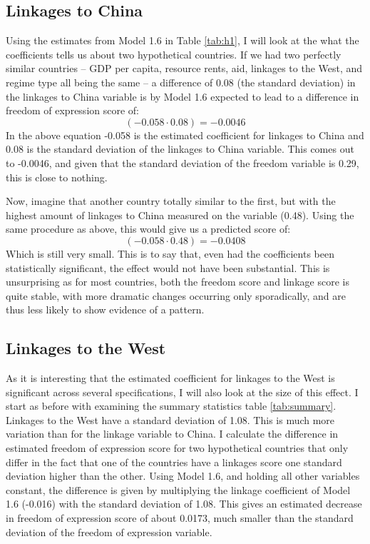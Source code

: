 \subsection{Linkages to China}
Using the estimates from Model 1.6 in Table \ref{tab:h1}, I will look at the what the coefficients tells us about two hypothetical countries. If we had two perfectly similar countries -- GDP per capita, resource rents, aid, linkages to the West, and regime type all being the same -- a difference of 0.08 (the standard deviation) in the linkages to China variable is by Model 1.6 expected to lead to a difference in freedom of expression score of:
\begin{equation*}
    (-0.058 \cdot 0.08) = -0.0046
\end{equation*}
In the above equation -0.058 is the estimated coefficient for linkages to China and 0.08 is the standard deviation of the linkages to China variable. This comes out to -0.0046, and given that the standard deviation of the freedom variable is 0.29, this is close to nothing.

Now, imagine that another country totally similar to the first, but with the highest amount of linkages to China measured on the variable (0.48). Using the same procedure as above, this would give us a predicted score of:
\begin{equation*}
    (-0.058 \cdot 0.48) = -0.0408
\end{equation*}
Which is still very small. This is to say that, even had the coefficients been statistically significant, the effect would not have been substantial. This is unsurprising as for most countries, both the freedom score and linkage score is quite stable, with more dramatic changes occurring only sporadically, and are thus less likely to show evidence of a pattern.

\subsection{Linkages to the West} \label{sec:west_coefficients}
As it is interesting that the estimated coefficient for linkages to the West is significant across several specifications, I will also look at the size of this effect. I start as before with examining the summary statistics table \ref{tab:summary}. Linkages to the West have a standard deviation of 1.08. This is much more variation than for the linkage variable to China. I calculate the difference in estimated freedom of expression score for two hypothetical countries that only differ in the fact that one of the countries have a linkages score one standard deviation higher than the other. Using Model 1.6, and holding all other variables constant, the difference is given by multiplying the linkage coefficient of Model 1.6 (-0.016) with the standard deviation of 1.08. This gives an estimated decrease in freedom of expression score of about 0.0173, much smaller than the standard deviation of the freedom of expression variable. 

